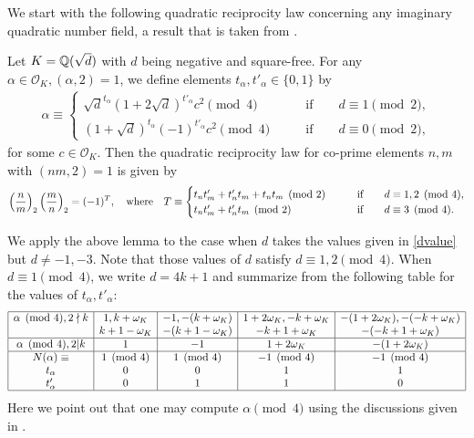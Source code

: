 \documentclass[twoside,leqno,10pt, A4]{amsart}
\begin{document}
   We start with the following quadratic reciprocity law concerning any imaginary quadratic number field, a result that is taken from \cite[Theorem 12.17]{Lemmermeyer05}.
\begin{lemma}
\label{Quadrecgen}
   Let $K=\mathbb Q(\sqrt{d})$ with $d$ being negative and square-free. For any $\alpha \in \mathcal O_K, (\alpha, 2)=1$, we define elements $t_{\alpha}, t'_{\alpha} \in \{ 0,1 \}$ by
\begin{align}
\label{alphadef}
   \alpha \equiv  \begin{cases}
   \sqrt{d}^{t_{\alpha}} (1+2\sqrt{d})^{t'_{\alpha}}c^2  \pmod 4 \qquad & \text{if} \qquad d \equiv 1 \pmod 2,\\
    (1+\sqrt{d})^{t_{\alpha}} (-1)^{t'_{\alpha}}c^2 \pmod 4 \qquad & \text{if} \qquad d \equiv 0 \pmod 2,
\end{cases}
\end{align}
   for some $c \in \mathcal O_K$. Then the quadratic reciprocity law for co-prime elements $n,m$ with $(nm, 2)=1$ is given by
\begin{align*}
    \left(\frac{n}{m}\right)_2\left(\frac{m}{n}\right)_2=(-1)^{T}, \quad \mbox{where} \quad
   T \equiv  \begin{cases}
   t_{n}t'_{m}+ t'_{n}t_{m}+ t_{n}t_{m}\pmod 2 \qquad & \text{if} \qquad d \equiv 1, 2 \pmod 4,\\
    t_{n}t'_{m}+ t'_{n}t_{m} \pmod 2 \qquad & \text{if} \qquad d \equiv 3 \pmod 4.
\end{cases}
\end{align*}
\end{lemma}

  We apply the above lemma to the case when $d$ takes the values given in \eqref{dvalue} but $d \neq -1, -3$. Note that those values of $d$ satisfy $d \equiv 1, 2 \pmod 4$. When $d \equiv 1 \pmod 4$, we write $d=4k+1$ and summarize from \cite{Lemmermeyer05} the following table for the values of $t_{\alpha}, t'_{\alpha}$:
\begin{align}
\label{tabled1}
   \begin{array}{|c|c|c|c|c|}     \hline
 \alpha \pmod 4,  2 \nmid k & 1, k+\omega_K & -1, -(k+\omega_K) & 1+2\omega_K, -k+\omega_K & -(1+2\omega_K),  -(-k+\omega_K) \\ 
 & k+1-\omega_K & -(k+1-\omega_K) & -k+1+\omega_K & -(-k+1+\omega_K) \\ \hline
  \alpha \pmod 4, 2 | k  & 1 & -1 & 1+2\omega_K & -(1+2\omega_K)  \\ \hline
    N(\alpha) \equiv & 1 \pmod 4 & 1 \pmod 4 & -1 \pmod 4 & -1 \pmod 4 \\
    t_{\alpha} & 0 & 0 & 1 &1 \\
     t'_{\alpha} & 0 & 1 & 1 &0 \\
     \hline
   \end{array}
\end{align}
  Here we point out that one may compute $\alpha \pmod 4$ using the discussions given in \cite[Section 2.2]{G&Zhao2309}. \newline
\end{document}
